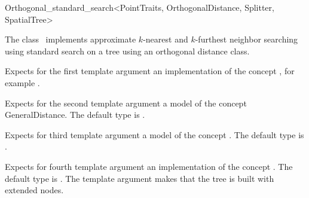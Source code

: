 

\begin{ccRefClass}{Orthogonal_standard_search<PointTraits, OrthogonalDistance, Splitter, SpatialTree>}


\ccDefinition

The class \ccRefName\ implements approximate $k$-nearest and $k$-furthest neighbor searching
using standard search on a  tree using an orthogonal distance
class. 


\ccParameters

Expects for the first template argument an implementation of the concept ,
for example .

Expects for the second template argument a model of the
concept GeneralDistance. The default type is 
.

Expects for third template argument a model of the concept .
The default type is .

Expects for fourth template argument an implementation of the concept .
The default type is .  The 
template argument  makes that the tree is built with extended nodes.

\ccTypes





\end{ccRefClass}
